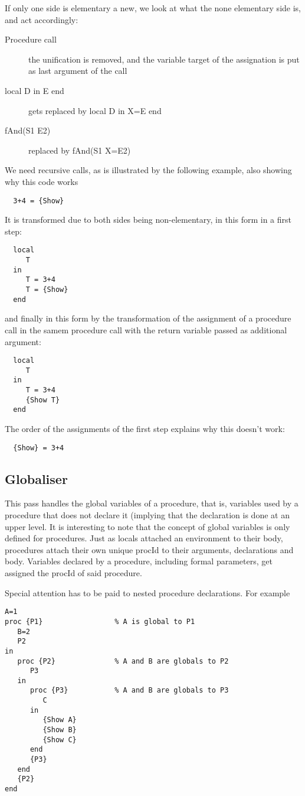 \documentclass[a4paper]{memoir}
\begin{document}
If only one side is elementary a new, we look at what the none elementary side is, and act accordingly:
\begin{description}
  \item[Procedure call] the unification is removed, and the variable target of the assignation is put as last argument of the call
  \item[local D in E end] gets replaced by local D in X=E end
  \item[fAnd(S1 E2)] replaced by fAnd(S1 X=E2)
\end{description}
We need recursive calls, as is illustrated by the following example, also showing why this code works
\begin{lstlisting}
  3+4 = {Show}
\end{lstlisting}
It is transformed due to both sides being non-elementary, in this form in a first step:
\begin{lstlisting}
  local
     T
  in
     T = 3+4
     T = {Show}
  end
\end{lstlisting}
and finally in this form by the transformation of the assignment of a procedure call in the samem procedure call with the return variable passed as additional argument:
\begin{lstlisting}
  local
     T
  in
     T = 3+4
     {Show T}
  end
\end{lstlisting}
The order of the assignments of the first step explains why this doesn't work:
\begin{lstlisting}
  {Show} = 3+4
\end{lstlisting}


\subsection{Globaliser}            
This pass handles the global variables of a procedure, that is, variables used by a procedure that does not declare it (implying that the declaration is done at an upper level. It is interesting to note that the concept of global variables is only defined for procedures.
Just as locals attached an environment to their body, procedures attach their own unique procId to their arguments, declarations and body.
Variables declared by a procedure, including formal parameters, get assigned the procId of said procedure.

Special attention has to be paid to nested procedure declarations. For example
\begin{lstlisting}
A=1
proc {P1}                 % A is global to P1
   B=2
   P2
in
   proc {P2}              % A and B are globals to P2
      P3 
   in
      proc {P3}           % A and B are globals to P3
         C
      in
         {Show A}
         {Show B}
         {Show C}
      end
      {P3}
   end
   {P2}
end
\end{lstlisting}
\end{document}
